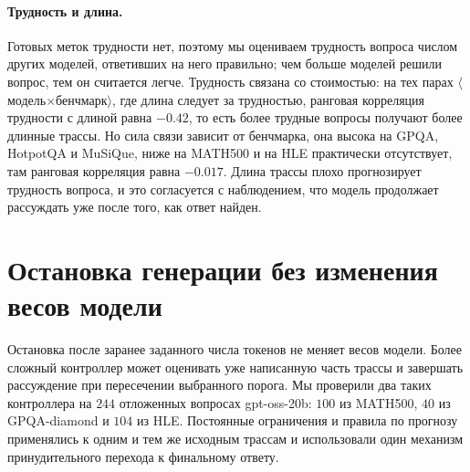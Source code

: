 \documentclass[11pt]{article}
\begin{document}
\paragraph{Трудность и длина.} Готовых меток трудности нет, поэтому мы оцениваем трудность вопроса числом других моделей, ответивших на него правильно; чем больше моделей решили вопрос, тем он считается легче. Трудность связана со стоимостью: на тех парах $\langle$модель$\times$бенчмарк$\rangle$, где длина следует за трудностью, ранговая корреляция трудности с длиной равна $-0.42$, то есть более трудные вопросы получают более длинные трассы. Но сила связи зависит от бенчмарка, она высока на GPQA, HotpotQA и MuSiQue, ниже на MATH500 и на HLE практически отсутствует, там ранговая корреляция равна $-0.017$. Длина трассы плохо прогнозирует трудность вопроса, и это согласуется с наблюдением, что модель продолжает рассуждать уже после того, как ответ найден.

\section{Остановка генерации без изменения весов модели}
\label{sec:nolearn}

Остановка после заранее заданного числа токенов не меняет весов модели. Более сложный контроллер может оценивать уже написанную часть трассы и завершать рассуждение при пересечении выбранного порога. Мы проверили два таких контроллера на $244$ отложенных вопросах gpt-oss-20b: $100$ из MATH500, $40$ из GPQA-diamond и $104$ из HLE. Постоянные ограничения и правила по прогнозу применялись к одним и тем же исходным трассам и использовали один механизм принудительного перехода к финальному ответу.
\end{document}
